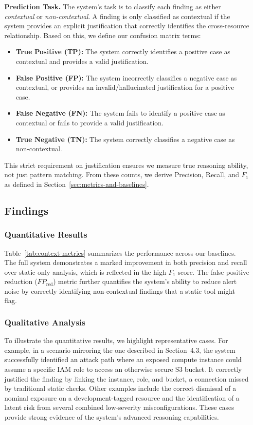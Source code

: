 \textbf{Prediction Task.} The system's task is to classify each finding as either \emph{contextual} or \emph{non-contextual}. A finding is only classified as contextual if the system provides an explicit justification that correctly identifies the cross-resource relationship. Based on this, we define our confusion matrix terms:
\begin{itemize}
    \item \textbf{True Positive (TP):} The system correctly identifies a positive case as contextual and provides a valid justification.
    \item \textbf{False Positive (FP):} The system incorrectly classifies a negative case as contextual, or provides an invalid/hallucinated justification for a positive case.
    \item \textbf{False Negative (FN):} The system fails to identify a positive case as contextual or fails to provide a valid justification.
    \item \textbf{True Negative (TN):} The system correctly classifies a negative case as non-contextual.
\end{itemize}
This strict requirement on justification ensures we measure true reasoning ability, not just pattern matching. From these counts, we derive Precision, Recall, and $F_1$ as defined in Section~\ref{sec:metrics-and-baselines}.

\subsection{Findings}

\subsubsection*{Quantitative Results}
Table~\ref{tab:context-metrics} summarizes the performance across our baselines. The full system demonstrates a marked improvement in both precision and recall over static-only analysis, which is reflected in the high $F_1$ score. The false-positive reduction ($FP_{\text{red}}$) metric further quantifies the system's ability to reduce alert noise by correctly identifying non-contextual findings that a static tool might flag.

\subsubsection*{Qualitative Analysis}
To illustrate the quantitative results, we highlight representative cases. For example, in a scenario mirroring the one described in Section~4.3, the system successfully identified an attack path where an exposed compute instance could assume a specific IAM role to access an otherwise secure S3 bucket. It correctly justified the finding by linking the instance, role, and bucket, a connection missed by traditional static checks. Other examples include the correct dismissal of a nominal exposure on a development-tagged resource and the identification of a latent risk from several combined low-severity misconfigurations. These cases provide strong evidence of the system's advanced reasoning capabilities.


